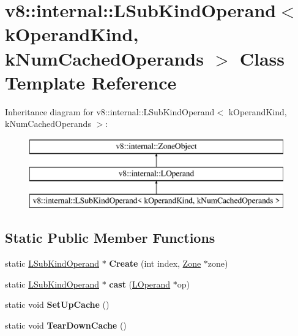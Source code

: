 \hypertarget{classv8_1_1internal_1_1_l_sub_kind_operand}{}\section{v8\+:\+:internal\+:\+:L\+Sub\+Kind\+Operand$<$ k\+Operand\+Kind, k\+Num\+Cached\+Operands $>$ Class Template Reference}
\label{classv8_1_1internal_1_1_l_sub_kind_operand}
Inheritance diagram for v8\+:\+:internal\+:\+:L\+Sub\+Kind\+Operand$<$ k\+Operand\+Kind, k\+Num\+Cached\+Operands $>$\+:\begin{figure}[H]
\begin{center}
\leavevmode
\includegraphics[height=3.000000cm]{classv8_1_1internal_1_1_l_sub_kind_operand}
\end{center}
\end{figure}
\subsection*{Static Public Member Functions}
\begin{DoxyCompactItemize}
\item 
static \hyperlink{classv8_1_1internal_1_1_l_sub_kind_operand}{L\+Sub\+Kind\+Operand} $\ast$ {\bfseries Create} (int index, \hyperlink{classv8_1_1internal_1_1_zone}{Zone} $\ast$zone)\hypertarget{classv8_1_1internal_1_1_l_sub_kind_operand_acf77f214705fb8d875d08b1a6edb52dc}{}\label{classv8_1_1internal_1_1_l_sub_kind_operand_acf77f214705fb8d875d08b1a6edb52dc}

\item 
static \hyperlink{classv8_1_1internal_1_1_l_sub_kind_operand}{L\+Sub\+Kind\+Operand} $\ast$ {\bfseries cast} (\hyperlink{classv8_1_1internal_1_1_l_operand}{L\+Operand} $\ast$op)\hypertarget{classv8_1_1internal_1_1_l_sub_kind_operand_aadedb52c7c05fd5817b70bb15b21a5b8}{}\label{classv8_1_1internal_1_1_l_sub_kind_operand_aadedb52c7c05fd5817b70bb15b21a5b8}

\item 
static void {\bfseries Set\+Up\+Cache} ()\hypertarget{classv8_1_1internal_1_1_l_sub_kind_operand_ac690da0165e2ab3b7d8fc7b1f47ac437}{}\label{classv8_1_1internal_1_1_l_sub_kind_operand_ac690da0165e2ab3b7d8fc7b1f47ac437}

\item 
static void {\bfseries Tear\+Down\+Cache} ()\hypertarget{classv8_1_1internal_1_1_l_sub_kind_operand_ad34cf27f308b9b427e11d1d5bdb0cc41}{}\label{classv8_1_1internal_1_1_l_sub_kind_operand_ad34cf27f308b9b427e11d1d5bdb0cc41}

\end{DoxyCompactItemize}

